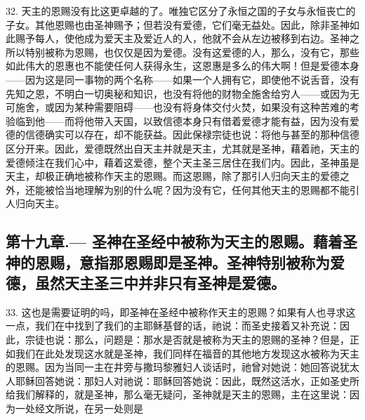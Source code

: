32. 天主的恩赐没有比这更卓越的了。唯独它区分了永恒之国的子女与永恒丧亡的子女。其他恩赐也由圣神赐予；但若没有爱德，它们毫无益处。因此，除非圣神如此赐予每人，使他成为爱天主及爱近人的人，他就不会从左边被移到右边。圣神之所以特别被称为恩赐，也仅仅是因为爱德。没有这爱德的人，那么，没有它，那些如此伟大的恩惠也不能使任何人获得永生，这恩惠是多么的伟大啊！但是爱德本身——因为这是同一事物的两个名称——如果一个人拥有它，即使他不说舌音，没有先知之恩，不明白一切奥秘和知识，也没有将他的财物全施舍给穷人——或因为无可施舍，或因为某种需要阻碍——也没有将身体交付火焚，如果没有这种苦难的考验临到他——而将他带入天国，以致信德本身只有借着爱德才能有益，因为没有爱德的信德确实可以存在，却不能获益。因此保禄宗徒也说：将他与甚至的那种信德区分开来。因此，爱德既然出自天主并就是天主，尤其就是圣神，藉着祂，天主的爱德倾注在我们心中，藉着这爱德，整个天主圣三居住在我们内。因此，圣神虽是天主，却极正确地被称作天主的恩赐。而这恩赐，除了那引人归向天主的爱德之外，还能被恰当地理解为别的什么呢？因为没有它，任何其他天主的恩赐都不能引人归向天主。\par


\subsection{第十九章.— 圣神在圣经中被称为天主的恩赐。藉着圣神的恩赐，意指那恩赐即是圣神。圣神特别被称为爱德，虽然天主圣三中并非只有圣神是爱德。}

33. 这也是需要证明的吗，即圣神在圣经中被称作天主的恩赐？如果有人也寻求这一点，我们在中找到了我们的主耶稣基督的话，祂说：而圣史接着又补充说：因此，宗徒也说：那么，问题是：那水是否就是被称为天主的恩赐的圣神？但是，正如我们在此处发现这水就是圣神，我们同样在福音的其他地方发现这水被称为天主的恩赐。因为当同一主在井旁与撒玛黎雅妇人谈话时，祂曾对她说：她回答说犹太人耶稣回答她说：那妇人对祂说：耶稣回答她说：因此，既然这活水，正如圣史所给我们解释的，就是圣神，那么毫无疑问，圣神就是天主的恩赐，主在这里说：因为一处经文所说，在另一处则是\par

